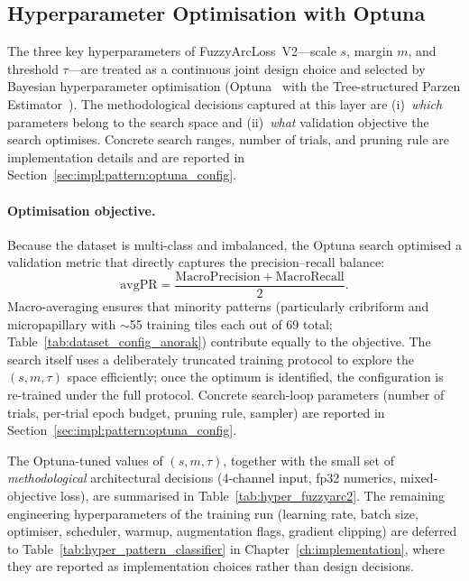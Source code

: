 \subsection{Hyperparameter Optimisation with Optuna}
\label{sec:meth:pattern:optuna}

The three key hyperparameters of FuzzyArcLoss~V2---scale $s$, margin
$m$, and threshold $\tau$---are treated as a continuous joint design
choice and selected by Bayesian hyperparameter optimisation
(Optuna~\cite{akiba2019optuna} with the Tree-structured Parzen
Estimator~\cite{bergstra2011tpe}).
The methodological decisions captured at this layer are
(i)~\emph{which} parameters belong to the search space and
(ii)~\emph{what} validation objective the search optimises.
Concrete search ranges, number of trials, and pruning rule are
implementation details and are reported in
Section~\ref{sec:impl:pattern:optuna_config}.

\paragraph{Optimisation objective.}
Because the dataset is multi-class and imbalanced, the Optuna search
optimised a validation metric that directly captures the
precision--recall balance:
\begin{equation}
\label{eq:avgpr_optuna}
\mathrm{avgPR} = \frac{\mathrm{MacroPrecision} + \mathrm{MacroRecall}}{2}.
\end{equation}
Macro-averaging ensures that minority patterns (particularly cribriform
and micropapillary with $\sim$55 training tiles each out of 69 total;
Table~\ref{tab:dataset_config_anorak}) contribute equally to
the objective.
The search itself uses a deliberately truncated training protocol to
explore the $(s, m, \tau)$ space efficiently; once the optimum is
identified, the configuration is re-trained under the full protocol.
Concrete search-loop parameters (number of trials, per-trial epoch
budget, pruning rule, sampler) are reported in
Section~\ref{sec:impl:pattern:optuna_config}.
 
The Optuna-tuned values of $(s, m, \tau)$, together with the small set
of \emph{methodological} architectural decisions (4-channel input,
fp32 numerics, mixed-objective loss), are summarised in
Table~\ref{tab:hyper_fuzzyarc2}.
The remaining engineering hyperparameters of the training run
(learning rate, batch size, optimiser, scheduler, warmup, augmentation
flags, gradient clipping) are deferred to
Table~\ref{tab:hyper_pattern_classifier} in
Chapter~\ref{ch:implementation}, where they are reported as
implementation choices rather than design decisions.
 
